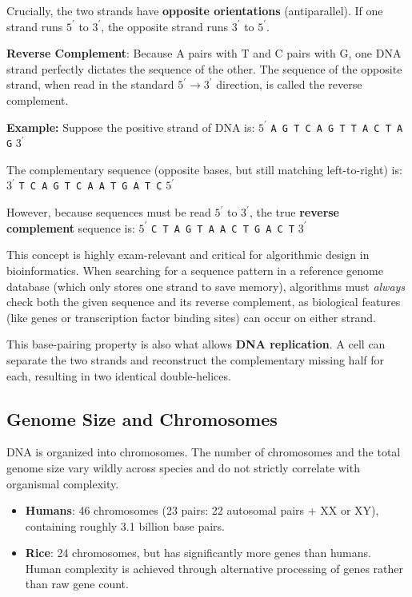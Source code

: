 Crucially, the two strands have \textbf{opposite orientations} (antiparallel). If one strand runs $5^{\prime}$ to $3^{\prime}$, the opposite strand runs $3^{\prime}$ to $5^{\prime}$. 

\begin{important}
  \textbf{Reverse Complement}: Because A pairs with T and C pairs with G, one DNA strand perfectly dictates the sequence of the other. The sequence of the opposite strand, when read in the standard $5^{\prime} \to 3^{\prime}$ direction, is called the reverse complement.
\end{important}

\textbf{Example:}
Suppose the positive strand of DNA is:
$5^{\prime}$ \texttt{A G T C A G T T A C T A G} $3^{\prime}$

The complementary sequence (opposite bases, but still matching left-to-right) is:
$3^{\prime}$ \texttt{T C A G T C A A T G A T C} $5^{\prime}$

However, because sequences must be read $5^{\prime}$ to $3^{\prime}$, the true \textbf{reverse complement} sequence is:
$5^{\prime}$ \texttt{C T A G T A A C T G A C T} $3^{\prime}$

\sta This concept is highly exam-relevant and critical for algorithmic design in bioinformatics. When searching for a sequence pattern in a reference genome database (which only stores one strand to save memory), algorithms must \textit{always} check both the given sequence and its reverse complement, as biological features (like genes or transcription factor binding sites) can occur on either strand.

This base-pairing property is also what allows \textbf{DNA replication}. A cell can separate the two strands and reconstruct the complementary missing half for each, resulting in two identical double-helices.

\subsection{Genome Size and Chromosomes}
DNA is organized into chromosomes. The number of chromosomes and the total genome size vary wildly across species and do not strictly correlate with organismal complexity. 
\begin{itemize}
  \item \textbf{Humans}: 46 chromosomes (23 pairs: 22 autosomal pairs + XX or XY), containing roughly 3.1 billion base pairs.
  \item \textbf{Rice}: 24 chromosomes, but has significantly more genes than humans. Human complexity is achieved through alternative processing of genes rather than raw gene count.
\end{itemize}

